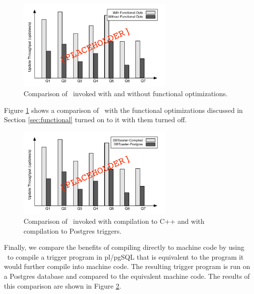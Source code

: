 \begin{figure}
\begin{center}
\includegraphics[width=3in]{../graphics-tmp/placeholder_throughput_k3opt}
\end{center}
\label{fig:experiments:throughput_functional}
\caption{Comparison of \dbtoaster\ invoked with and without functional optimizations.}
\end{figure}
Figure \ref{fig:experiments:throughput_functional} shows a comparison of \dbtoaster\ with the functional optimizations discussed in Section \ref{sec:functional} turned on to it with them turned off.  

\begin{figure}
\begin{center}
\includegraphics[width=3in]{../graphics-tmp/placeholder_throughput_compile}
\end{center}
\label{fig:experiments:throughput_compile}
\caption{Comparison of \dbtoaster\ invoked with compilation to C++ and with compilation to Postgres triggers.}
\end{figure}
Finally, we compare the benefits of compiling directly to machine code by using \dbtoaster\ to compile a trigger program in pl/pgSQL that is equivalent to the program it would further compile into machine code.  The resulting trigger program is run on a Postgres database and compared to the equivalent machine code.  The results of this comparison are shown in Figure \ref{fig:experiments:throughput_compile}.

